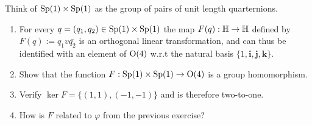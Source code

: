 \documentclass[12pt]{book}
\theoremstyle{definition}
\begin{document}
\begin{taggedexercise}[\textcolor{green}{Complete}]
  Think of $\mathrm{Sp}(1) \times \mathrm{Sp}(1)$ as the group of pairs of unit length quarternions.
  \begin{enumerate}
    \item For every $q = (q_1, q_2) \in \mathrm{Sp}(1) \times \mathrm{Sp}(1)$ the map $F(q): \mathbb{H} \to \mathbb{H}$ defined by $F(q) := q_1v\bar{q_2}$ is an orthogonal linear transformation, and can thus be identified with an element of $\mathrm{O}(4)$ w.r.t the natural basis $\{1, \mathbf{i}, \mathbf{j}, \mathbf{k}\}$.
    \item Show that the function $F: \mathrm{Sp}(1) \times \mathrm{Sp}(1) \to \mathrm{O}(4)$ is a group homomorphism.
    \item Verify $\ker{F} = \{(1, 1), (-1, -1)\}$ and is therefore two-to-one.
    \item How is $F$ related to $\varphi$ from the previous exercise?
  \end{enumerate}
\end{taggedexercise}
\end{document}
